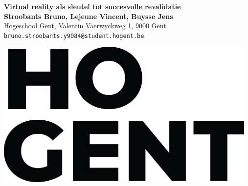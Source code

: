 \documentclass[a0,portrait]{a0poster}
\begin{document}


\begin{minipage}[t]{0.75\linewidth}
\VeryHuge \color{HoGentAccent1} \textbf{Virtual reality als sleutel tot succesvolle
    revalidatie} \color{Black}\\ %

\huge \textbf{Stroobants Bruno, Lejeune Vincent, Buysse Jens}\\[0.5cm] %
\huge Hogeschool Gent, Valentin Vaerwyckweg 1, 9000 Gent\\[0.4cm] %
\Large \texttt{bruno.stroobants.y9084@student.hogent.be} \\
\end{minipage}
%
\begin{minipage}[t]{0.25\linewidth}
\includegraphics[width=13cm,right]{figures/HOGENT_Logo_Pos_rgb.png} 

\end{minipage}

\vspace{1cm} %

\end{document}
